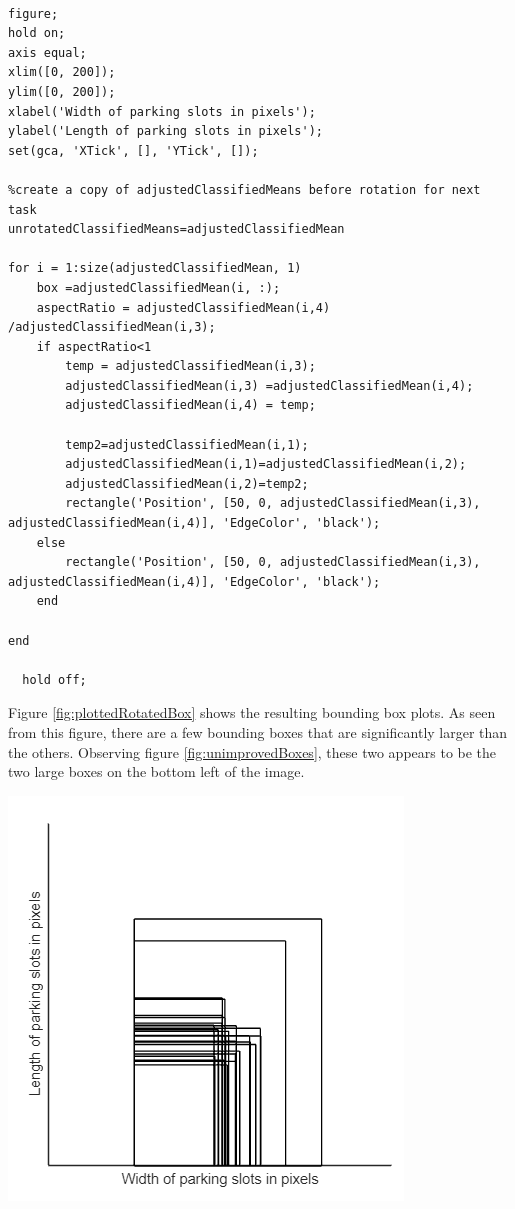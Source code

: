 \documentclass[man]{apa7}
\begin{document}
\begin{lstlisting}[]

figure;
hold on;
axis equal;
xlim([0, 200]);
ylim([0, 200]);
xlabel('Width of parking slots in pixels');
ylabel('Length of parking slots in pixels');
set(gca, 'XTick', [], 'YTick', []);

%create a copy of adjustedClassifiedMeans before rotation for next task
unrotatedClassifiedMeans=adjustedClassifiedMean

for i = 1:size(adjustedClassifiedMean, 1)
    box =adjustedClassifiedMean(i, :);
    aspectRatio = adjustedClassifiedMean(i,4) /adjustedClassifiedMean(i,3);
    if aspectRatio<1
        temp = adjustedClassifiedMean(i,3);
        adjustedClassifiedMean(i,3) =adjustedClassifiedMean(i,4);
        adjustedClassifiedMean(i,4) = temp;
        
        temp2=adjustedClassifiedMean(i,1);
        adjustedClassifiedMean(i,1)=adjustedClassifiedMean(i,2);
        adjustedClassifiedMean(i,2)=temp2;
        rectangle('Position', [50, 0, adjustedClassifiedMean(i,3), adjustedClassifiedMean(i,4)], 'EdgeColor', 'black');
    else
        rectangle('Position', [50, 0, adjustedClassifiedMean(i,3), adjustedClassifiedMean(i,4)], 'EdgeColor', 'black');
    end
      
end
  
  hold off;
\end{lstlisting}

Figure \ref{fig:plottedRotatedBox} shows the resulting bounding box plots. As seen from this figure, there are a few bounding boxes that are significantly larger than the others. Observing figure \ref{fig:unimprovedBoxes}, these two appears to be the two large boxes on the bottom left of the image. 

\begin{minipage}{\linewidth}
  \includegraphics[]{figures/bboxPlot.png}
  \label{fig:plottedRotatedBox}
\end{minipage}
\end{document}
